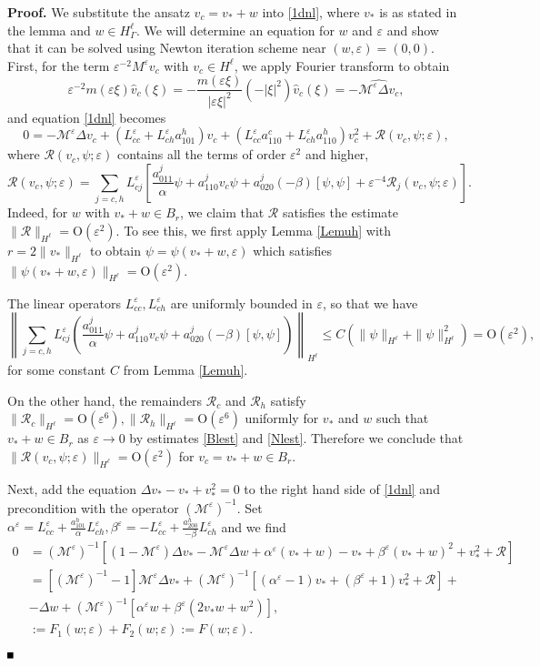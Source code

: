 \documentclass[10pt]{article}
\newenvironment{Proof}%
 {\begin{trivlist} \item[]{\bf Proof. }}%
 {\hspace*{\fill}$\rule{.4\baselineskip}{.4\baselineskip}$\end{trivlist}}
\newcommand{\rmO}{\mathrm{O}}
\newcommand{\eps}{\varepsilon}
\newcommand{\M}{\mathcal{M}}
\newcommand{\Rm}{\mathcal{R}}
\begin{document}
\begin{Proof}
We substitute the ansatz $v_c = v_* + w$ into \eqref{1dnl}, where $v_*$ is as stated in the lemma and $w \in H^\ell_{\Gamma}$. We will determine an equation for $w$ and $\eps$ and show that it can be solved using Newton iteration scheme near $(w,\eps)=(0,0)$.
First, for the term $\eps^{-2}M^\eps v_c$ with $v_c \in H^\ell$, we apply Fourier transform to obtain
\[
\eps^{-2}m(\eps\xi)\widehat{v}_c(\xi) = -\frac{m(\eps\xi)}{|\eps\xi|^2}(-|\xi|^2)\widehat{v}_c(\xi) = -\widehat{\M^\eps \Delta v_c},
\]
and equation \eqref{1dnl} becomes
\[
0 = -\M^\eps \Delta v_c + \left(L_{cc}^\eps +L_{ch}^\eps a_{101}^h\right)v_c+\left(L_{cc}^\eps a_{110}^c+L_{ch}^\eps a_{110}^h\right)v_c^2 + \Rm(v_c,\psi;\eps),
\]
where $\Rm(v_c,\psi;\eps)$ contains all the terms of order $\eps^2$ and higher,
\[
\Rm(v_c,\psi;\eps) =\sum_{j=c,h} L_{cj}^\eps\left[ \frac{a_{011}^j}{\alpha}\psi+a_{110}^j v_c\psi+a_{020}^j (-\beta)[\psi,\psi]+\eps^{-4}\Rm_j(v_c,\psi;\eps)\right].
\]
Indeed, for $w$ with $v_*+w \in B_r$, we claim that $\Rm$ satisfies the estimate $\|\Rm\|_{H^\ell} = \rmO(\eps^2)$.  To see this, we first apply Lemma \ref{Lemuh} with $r = 2\|v_*\|_{H^\ell}$ to obtain $\psi = \psi(v_*+w,\eps)$ which satisfies $\|\psi(v_*+w,\eps)\|_{H^\ell} = \rmO(\eps^2)$.

The linear operators $L_{cc}^\eps, L_{ch}^\eps$ are uniformly bounded in $\eps$, so that we have
\[
\left\|\sum_{j=c,h} L_{cj}^\eps\left( \frac{a_{011}^j}{\alpha}\psi+a_{110}^j v_c\psi+a_{020}^j (-\beta)[\psi,\psi]\right)\right\|_{H^\ell} \le C(\|\psi\|_{H^\ell}+\|\psi\|_{H^\ell}^2) = \rmO(\eps^2),
\]
for some constant $C$ from Lemma \ref{Lemuh}.

On the other hand, the remainders $\Rm_c$ and $\Rm_h$ satisfy $\|\Rm_c\|_{H^\ell}= \rmO(\eps^6), \|\Rm_h\|_{H^\ell} = \rmO(\eps^6)$ uniformly for $v_*$ and $w$ such that $v_* +w \in B_r$ as $\eps \to 0$ by  estimates \eqref{Blest} and \eqref{Nlest}. Therefore we conclude that $\|\Rm(v_c,\psi;\eps)\|_{H^\ell} = \rmO(\eps^2)$ for $v_c=v_*+w \in B_r$.
 
Next, add the equation $\Delta v_*-v_*+v_*^2 =0$ to the right hand side of \eqref{1dnl} and precondition with the operator $(\M^{\eps})^{-1}$. Set $\alpha^\eps = L_{cc}^\eps + \frac{a_{101}^h}{\alpha} L_{ch}^\eps , \beta^\eps=-L_{cc}^\eps +\frac{a_{200}^h}{-\beta} L_{ch}^\eps $ and we find
\begin{eqnarray}
0 &=(\M^\eps)^{-1}\left[ (1-\M^\eps)\Delta v_* -\M^\eps \Delta w+\alpha^\eps(v_*+w)-v_*+\beta^\eps(v_*+w)^2+v_*^2 + \Rm \right] \nonumber \\ 
&= [(\M^{\eps})^{-1}-1]\M^\eps \Delta v_*+(\M^{\eps})^{-1}\left[ (\alpha^\eps-1)v_*+(\beta^\eps+1)v_*^2+\Rm \right]+ \nonumber \\
&-\Delta w+(\M^{\eps})^{-1}\left[\alpha^\eps w+\beta^\eps(2v_*w+w^2)\right], \nonumber \\
&:= F_1(w;\eps)+F_2(w;\eps):= F(w;\eps).  \label{splfynl}
\end{eqnarray}


\end{Proof}
\end{document}
